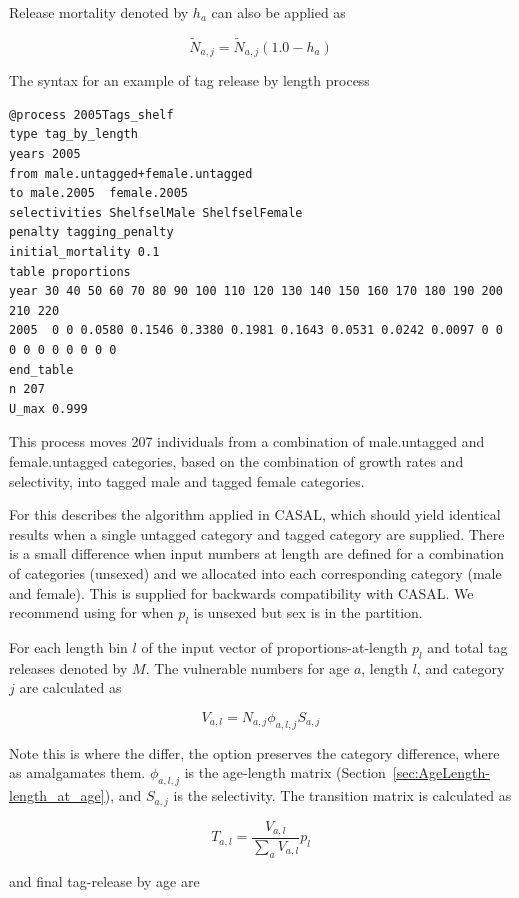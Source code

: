 Release mortality denoted by \(h_a\) can also be applied as

$$\widetilde{N}_{a,j} = \widetilde{N}_{a,j}\left(1.0 - h_a\right)$$

The syntax for an example of tag release by length process

{\small{\begin{verbatim}
@process 2005Tags_shelf
type tag_by_length
years 2005
from male.untagged+female.untagged
to male.2005  female.2005
selectivities ShelfselMale ShelfselFemale
penalty tagging_penalty
initial_mortality 0.1
table proportions
year 30 40 50 60 70 80 90 100 110 120 130 140 150 160 170 180 190 200 210 220
2005  0 0 0.0580 0.1546 0.3380 0.1981 0.1643 0.0531 0.0242 0.0097 0 0 0 0 0 0 0 0 0 0
end_table
n 207
U_max 0.999
\end{verbatim}}}

This process moves 207 individuals from a combination of male.untagged and female.untagged categories, based on the combination of growth rates and selectivity, into tagged male and tagged female categories.

For  
this describes the algorithm applied in CASAL, which should yield identical results when a single untagged category and tagged category are supplied. There is a small difference when input numbers at length are defined for a combination of categories (unsexed) and we allocated into each corresponding category (male and female). This is supplied for backwards compatibility with CASAL. We recommend using  for when ${p}_l$ is unsexed but sex is in the partition.

For each length bin $l$ of the input vector of proportions-at-length ${p}_l$ and total tag releases denoted by \(M\). The vulnerable numbers for age \(a\), length \(l\), and category \(j\) are calculated as

$$V_{a,l} = N_{a,j} \phi_{a,l,j} S_{a,j}$$

Note this is where the  differ, the  option preserves the category difference, where as  amalgamates them. \(\phi_{a,l,j}\) is the age-length matrix (Section~\ref{sec:AgeLength-length_at_age}), and \(S_{a,j}\) is the selectivity. The transition matrix is calculated as

$$ T_{a,l}= \frac{V_{a,l}}{\sum_a V_{a,l}} {p}_l$$

and final tag-release by age are

